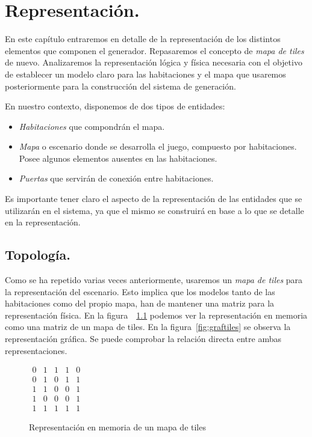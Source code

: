 \chapter{Representación.}\label{cap:capitulo3}

En este capítulo entraremos en detalle de la representación de los distintos elementos que componen el generador. Repasaremos el concepto de \emph{mapa de tiles} de nuevo. Analizaremos la representación lógica y física necesaria con el objetivo de establecer un modelo claro para las habitaciones y el mapa que usaremos posteriormente para la construcción del sistema de generación.


En nuestro contexto, disponemos de dos tipos de entidades:

\begin{itemize}
	\item \emph{Habitaciones} que compondrán el mapa.
	\item \emph{Mapa} o escenario donde se desarrolla el juego, compuesto por habitaciones. Posee algunos elementos ausentes en las habitaciones.
	\item \emph{Puertas} que servirán de conexión entre habitaciones.
\end{itemize}

Es importante tener claro el aspecto de la representación de las entidades que se utilizarán en el sistema, ya que el mismo se construirá en base a lo que se detalle en la representación.

\section{Topología.}

Como se ha repetido varias veces anteriormente, usaremos un \emph{mapa de tiles} para la representación del escenario. Esto implica que los modelos tanto de las habitaciones como del propio mapa, han de mantener una matriz para la representación física. En la figura~~\ref{fig:memtiles} podemos ver la representación en memoria como una matriz de un mapa de tiles. En la figura~\ref{fig:graftiles} se observa la representación gráfica. Se puede comprobar la relación directa entre ambas representaciones.


\begin{figure}[h]
\centering
{
	$
\begin{matrix}
	0 & 1 & 1 & 1 & 0 \\
	0 & 1 & 0 & 1 & 1 \\
	1 & 1 & 0 & 0 & 1 \\
	1 & 0 & 0 & 0 & 1 \\
	1 & 1 & 1 & 1 & 1
\end{matrix}
$
}
\caption{Representación en memoria de un mapa de tiles
\label{fig:memtiles}
}
\end{figure}

